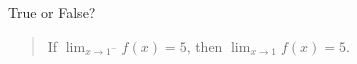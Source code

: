\documentclass{ximera}
\author{Gregory Hartman \and Matthew Carr}
\begin{document}
\begin{exercise}



True or False?
\begin{quote}
If $\lim_{x\to1^{-}}f(x)=5$, then $\lim_{x\to1}f(x)=5$.
\end{quote}

\begin{prompt}
\begin{multipleChoice}
\end{multipleChoice}
\end{prompt}

\end{exercise}
\end{document}
